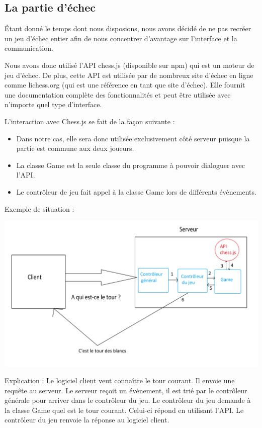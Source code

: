 \documentclass[12pt, openany]{report}
\begin{document}
\subsection{La partie d'échec}

Étant donné le temps dont nous disposions, nous avons décidé de ne pas recréer un jeu d'échec entier afin de nous concentrer d'avantage sur l'interface et la communication.

Nous avons donc utilisé l'API chess.js (disponible sur npm) qui est un moteur de jeu d'échec. De plus, cette API est utilisée par de nombreux site d'échec en ligne comme lichess.org (qui est une référence en tant que site d'échec). Elle fournit une documentation complète des fonctionnalités et peut être utilisée avec n'importe quel type d'interface. 

L'interaction avec Chess.js se fait de la façon suivante :
\begin{itemize}
    \item Dans notre cas, elle sera donc utilisée exclusivement côté serveur puisque la partie est commune aux deux joueurs. 
    \item La classe Game est la seule classe du programme à pouvoir dialoguer avec l'API.
    \item Le contrôleur de jeu fait appel à la classe Game lors de différents évènements.
\end{itemize}

Exemple de situation :

\begin{center}
    \centering
    \includegraphics[width=14cm]{src/image4.png}
\end{center}

Explication : \newline
Le logiciel client veut connaître le tour courant.
Il envoie une requête au serveur.
Le serveur reçoit un évènement, il est trié par le contrôleur générale pour arriver dans le contrôleur du jeu.
Le contrôleur du jeu demande à la classe Game quel est le tour courant.
Celui-ci répond en utilisant l'API.
Le contrôleur du jeu renvoie la réponse au logiciel client.
\end{document}
